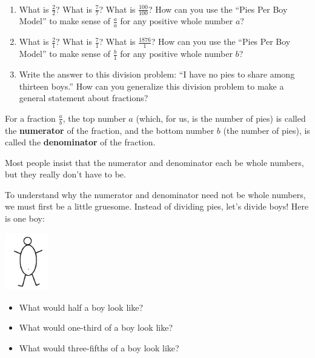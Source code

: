 \begin{thinkpair*}\ 

\begin{enumerate}
\item
What is $\frac 2 2$?  What is $\frac 7 7 $?  What is $\frac{100}{100}$?  How can you use the ``Pies Per Boy Model'' to make sense of $\frac a a$ for any positive whole number $a$?\\

\item
What is $\frac 2 1$?  What is $\frac 7 1 $?  What is $\frac{1876}{1}$?  How can you use the ``Pies Per Boy Model'' to make sense of $\frac b 1$ for any positive whole number $b$?\\

\item
Write the answer to this division problem: ``I have no pies to share among thirteen boys.''  How can you generalize this division problem to make a general statement about fractions?

\end{enumerate}

\end{thinkpair*}
 
 \begin{define}
 For a fraction $\frac a b$,
the top number $a$ (which, for us, is the number of pies) is called
the {\bf numerator} of the fraction, and the bottom number $b$ (the number of pies), is called the
{\bf denominator} of the fraction. 
 \end{define}
 
 Most people insist that the numerator and denominator  each be whole
numbers, but they really don't have to be.
 
 
  \begin{thinkpair*}
 To understand why the numerator and denominator need not be whole numbers, we must first  be a little gruesome.  Instead of dividing pies, let's divide boys!  Here is one boy:
  \begin{center}
\includegraphics[height = 2.5cm]{oneboy}
\end{center}

 \begin{itemize}
 \item
 What would half a boy look like?
 
 \item
 What would one-third of a boy look like?
 
 \item
 What would three-fifths of a boy look like?
 \end{itemize}
 
 \end{thinkpair*}


